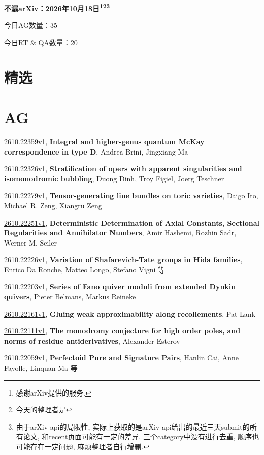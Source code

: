 \documentclass[9pt, a4paper]{article}
\theoremstyle{plain}
\theoremstyle{definition}
\theoremstyle{remark}
\newcommand{\arxiv}[3]{\href{https://arxiv.org/abs/#1}{#1}, \textbf{\textcolor{arxivblue}{#2}}, #3}
\newcommand{\AGnumber}{35}
\newcommand{\RTQAnumber}{20}
\newcommand{\NewestDate}{2026年10月18日}
\newcommand{\todayarXiver}{} %
\begin{document}
\begin{center}
    \Huge\textbf{不漏arXiv：\NewestDate\footnote{感谢arXiv提供的服务.}\footnote{今天的整理者是\todayarXiver}\footnote{由于arXiv api的局限性, 实际上获取的是arXiv api给出的最近三天submit的所有论文, 和recent页面可能有一定的差异. 三个category中没有进行去重, 顺序也可能存在一定问题, 麻烦整理者自行增删.}} \\
\end{center}

\setcounter{section}{-1}

\begin{center}
    今日AG数量：\AGnumber
    
    今日RT \& QA数量：\RTQAnumber
    
\end{center}


\section{精选}


\section{AG}
\arxiv{2610.22359v1}{Integral and higher-genus quantum McKay correspondence in type D}{Andrea Brini, Jingxiang Ma}

\arxiv{2610.22326v1}{Stratification of opers with apparent singularities and isomonodromic bubbling}{Duong Dinh, Troy Figiel, Joerg Teschner}

\arxiv{2610.22279v1}{Tensor-generating line bundles on toric varieties}{Daigo Ito, Michael R. Zeng, Xiangru Zeng}

\arxiv{2610.22251v1}{Deterministic Determination of Axial Constants, Sectional Regularities and Annihilator Numbers}{Amir Hashemi, Rozhin Sadr, Werner M. Seiler}

\arxiv{2610.22226v1}{Variation of Shafarevich-Tate groups in Hida families}{Enrico Da Ronche, Matteo Longo, Stefano Vigni 等}

\arxiv{2610.22203v1}{Series of Fano quiver moduli from extended Dynkin quivers}{Pieter Belmans, Markus Reineke}

\arxiv{2610.22161v1}{Gluing weak approximability along recollements}{Pat Lank}

\arxiv{2610.22111v1}{The monodromy conjecture for high order poles, and norms of residue antiderivatives}{Alexander Esterov}

\arxiv{2610.22059v1}{Perfectoid Pure and Signature Pairs}{Hanlin Cai, Anne Fayolle, Linquan Ma 等}
\end{document}
